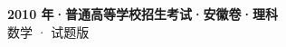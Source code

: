 \documentclass[zihao=-4, a4paper]{ctexart}
\begin{document}
\begin{center}
  {\Large\bfseries 2010 年·普通高等学校招生考试·安徽卷·理科}\\[4pt]
  {\large 数学 · 试题版}
\end{center}
\medskip
{}

\end{document}
